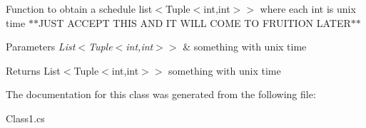 Function to obtain a schedule list$<$Tuple$<$int,int$>$$>$ where each int is unix time $\ast$$\ast$\+J\+U\+ST A\+C\+C\+E\+PT T\+H\+IS A\+ND IT W\+I\+LL C\+O\+ME TO F\+R\+U\+I\+T\+I\+ON L\+A\+T\+E\+R$\ast$$\ast$ 
\begin{DoxyParams}{Parameters}
{\em List$<$\+Tuple$<$int,int$>$$>$} & something with unix time \\
\hline
\end{DoxyParams}
\begin{DoxyReturn}{Returns}
List$<$Tuple$<$int,int$>$$>$ something with unix time 
\end{DoxyReturn}


The documentation for this class was generated from the following file\+:\begin{DoxyCompactItemize}
\item 
Class1.\+cs\end{DoxyCompactItemize}
